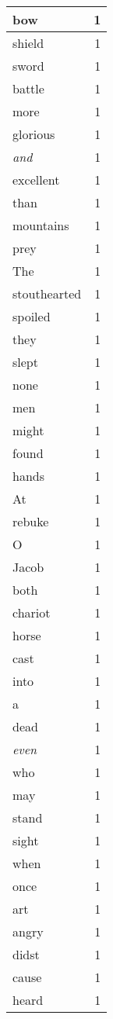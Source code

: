 \begin{center}
\begin{longtable}{l|r}
bow & 1 \\ \hline
shield & 1 \\ \hline
sword & 1 \\ \hline
battle & 1 \\ \hline
more & 1 \\ \hline
glorious & 1 \\ \hline
\emph{and} & 1 \\ \hline
excellent & 1 \\ \hline
than & 1 \\ \hline
mountains & 1 \\ \hline
prey & 1 \\ \hline
The & 1 \\ \hline
stouthearted & 1 \\ \hline
spoiled & 1 \\ \hline
they & 1 \\ \hline
slept & 1 \\ \hline
none & 1 \\ \hline
men & 1 \\ \hline
might & 1 \\ \hline
found & 1 \\ \hline
hands & 1 \\ \hline
At & 1 \\ \hline
rebuke & 1 \\ \hline
O & 1 \\ \hline
Jacob & 1 \\ \hline
both & 1 \\ \hline
chariot & 1 \\ \hline
horse & 1 \\ \hline
cast & 1 \\ \hline
into & 1 \\ \hline
a & 1 \\ \hline
dead & 1 \\ \hline
\emph{even} & 1 \\ \hline
who & 1 \\ \hline
may & 1 \\ \hline
stand & 1 \\ \hline
sight & 1 \\ \hline
when & 1 \\ \hline
once & 1 \\ \hline
art & 1 \\ \hline
angry & 1 \\ \hline
didst & 1 \\ \hline
cause & 1 \\ \hline
heard & 1 \\ \hline

\end{longtable}
\end{center}
